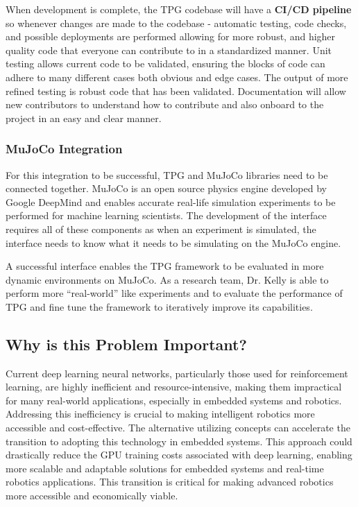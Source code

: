\documentclass{article}
\begin{document}
When development is complete, the TPG codebase will have a \textbf{CI/CD pipeline} so whenever changes are made to the codebase - automatic testing, code checks, and possible deployments are performed allowing for more robust, and higher quality code that everyone can contribute to in a standardized manner. Unit testing allows current code to be validated, ensuring the blocks of code can adhere to many different cases both obvious and edge cases. The output of more refined testing is robust code that has been validated. Documentation will allow new contributors to understand how to contribute and also onboard to the project in an easy and clear manner.

\subsubsection{MuJoCo Integration}

For this integration to be successful, TPG and MuJoCo libraries need to be connected together. MuJoCo is an open source physics engine developed by Google DeepMind and enables accurate real-life simulation experiments to be performed for machine learning scientists. The development of the interface requires all of these components as when an experiment is simulated, the interface needs to know what it needs to be simulating on the MuJoCo engine. 

A successful interface enables the TPG framework to be evaluated in more dynamic environments on MuJoCo. As a research team, Dr. Kelly is able to perform more “real-world” like experiments and to evaluate the performance of TPG and fine tune the framework to iteratively improve its capabilities.

\subsection{Why is this Problem Important?}
Current deep learning neural networks, particularly those used for reinforcement learning, are highly inefficient and resource-intensive, making them impractical for many real-world applications, especially in embedded systems and robotics. Addressing this inefficiency is crucial to making intelligent robotics more accessible and cost-effective.  The alternative utilizing concepts  can accelerate the transition to adopting this technology in embedded systems. This approach could drastically reduce the GPU training costs associated with deep learning, enabling more scalable and adaptable solutions for embedded systems and real-time robotics applications. This transition is critical for making advanced robotics more accessible and economically viable.
\end{document}
